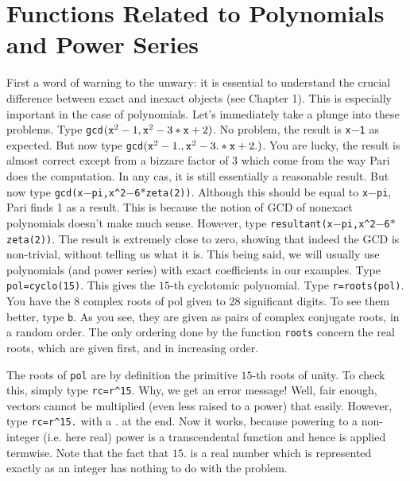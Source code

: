 \section{Functions Related to Polynomials and Power Series}
\medskip
First a word of warning to the unwary: it is essential to understand the
crucial difference between exact and inexact objects (see Chapter 1). This
is especially important in the case of polynomials. Let's immediately take
a plunge into these problems. Type {\tt gcd$({\tt x}^2-1,{\tt x}^2-3*{\tt x}+2)$}. No problem,
the result is {\tt x$-$1} as expected. But now type 
{\tt gcd$({\tt x}^2-1.,{\tt x}^2-3.*{\tt x}+2.)$}. You are lucky, the result is almost
correct except from a bizzare factor of 3 which come from the way Pari does
the computation. In any cas, it is still essentially a reasonable result.
But now type {\tt gcd(x$-$pi,x\^{}2$-$6$*$zeta(2))}. Although this should be
equal to {\tt x$-$pi}, Pari finds 1 as a result. This is because the notion
of GCD of nonexact polynomials doesn't make much sense. However, type
{\tt resultant(x$-$pi,x\^{}2$-$6$*$zeta(2))}. The result is extremely close
to zero, showing that indeed the GCD is non-trivial, without telling us
what it is. This being said, we will usually use polynomials (and power series)
with exact coefficients in our examples.
\smallskip
Type {\tt pol=cyclo(15)}. This gives the $15$-th cyclotomic polynomial.
Type {\tt r=roots(pol)}. You have the 8 complex roots of pol given to 28
significant digits. To see them better, type {\tt\bs b}. As you see, they are
given as pairs of complex conjugate roots, in a random order. The only ordering
done by the function {\tt roots} concern the real roots, which are given
first, and in increasing order.

The roots of {\tt pol} are by definition the primitive $15$-th roots of unity.
To check this, simply type {\tt rc=r\^{}15}. Why, we get an error message! 
Well, fair enough, vectors cannot be multiplied (even less raised to a power) 
that easily. However, type {\tt rc=r\^{}15.} with a $.$ at the end. Now it 
works, because powering to a non-integer (i.e. here real) power is a
transcendental function and hence is applied termwise. Note that the fact that
$15.$ is a real number which is represented exactly as an integer has nothing 
to do with the problem.

